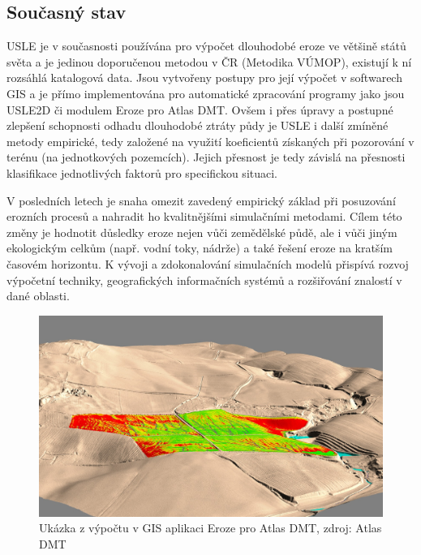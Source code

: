 \newpage
\subsection{Současný stav}
USLE je v současnosti používána pro výpočet dlouhodobé eroze ve
většině států světa a je jedinou doporučenou metodou v ČR (Metodika
VÚMOP\cite{janecek2012}), existují k ní rozsáhlá katalogová data. Jsou
vytvořeny postupy pro její výpočet v softwarech GIS a je přímo
implementována pro automatické zpracování programy jako jsou USLE2D či
modulem Eroze pro Atlas DMT. Ovšem i přes úpravy a postupné zlepšení
schopnosti odhadu dlouhodobé ztráty půdy je USLE i další zmíněné
metody empirické, tedy založené na využití koeficientů získaných při
pozorování v terénu (na jednotkových pozemcích). Jejich přesnost je
tedy závislá na přesnosti klasifikace jednotlivých faktorů pro
specifickou situaci.

V posledních letech je snaha omezit zavedený empirický základ při
posuzování erozních procesů a nahradit ho kvalitnějšími simulačními
metodami. Cílem této změny je hodnotit důsledky eroze nejen vůči
zemědělské půdě, ale i vůči jiným ekologickým celkům (např. vodní
toky, nádrže) a také řešení eroze na kratším časovém horizontu.  K
vývoji a zdokonalování simulačních modelů přispívá rozvoj výpočetní
techniky, geografických informačních systémů a rozšiřování znalostí v
dané oblasti.\cite{janecek2012}
\begin{figure}[H]
    \centering
    \includegraphics[scale=0.25]{./pictures/atlas_eroze.jpg}
      \caption[Ukázka z výpočtu v GIS aplikaci Eroze pro Atlas
        DMT]{Ukázka z výpočtu v GIS aplikaci Eroze pro Atlas DMT,
        zdroj: Atlas DMT\cite{atlas_e}}
      \label{fig:atlas_eroze}
\end{figure}

